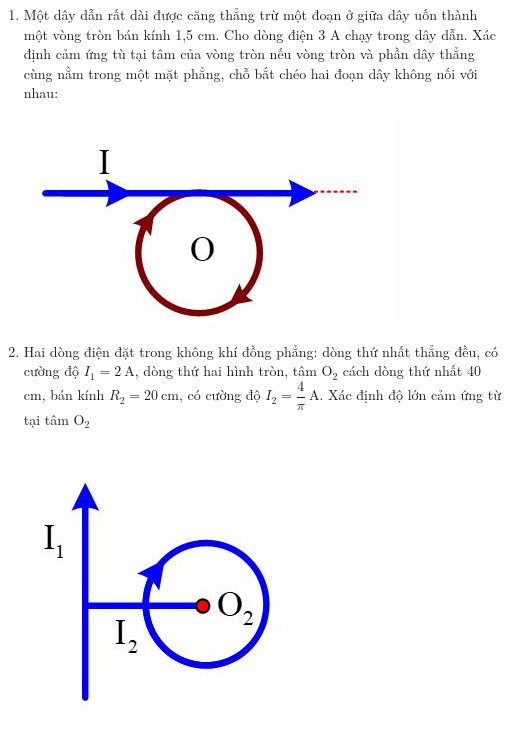 \begin{enumerate}
{	}
	\item{Một dây dẫn rất dài được căng thẳng trừ một đoạn ở giữa dây uốn thành một vòng tròn bán kính 1,5 cm. Cho dòng điện 3 A chạy trong dây dẫn. Xác định cảm ứng tù tại tâm của vòng tròn nếu vòng tròn và phần dây thẳng cùng nằm trong một mặt phẳng, chỗ bắt chéo hai đoạn dây không nối với nhau:
		\begin{center}
			\includegraphics[scale=0.6]{../figs/VN11-PH-26-P-017-1-2.JPG}
		\end{center}	 
		
		
	}
	\item {Hai dòng điện đặt trong không khí đồng phẳng: dòng thứ nhất thẳng đều, có cường độ $I_1 = 2\ \text{A}$, dòng thứ hai hình tròn, tâm $\text{O}_2$ cách dòng thứ nhất 40 cm, bán kính $R_2 = 20\ \text{cm}$, có cường độ $I_2 = \dfrac{4}{\pi}\ \text{A}$. Xác định độ lớn cảm ứng từ tại tâm $\text{O}_2$
		\begin{center}
			\includegraphics[scale=0.6]{../figs/VN11-PH-26-P-017-1-3.JPG}
		\end{center}	
		
}
\end{enumerate}
